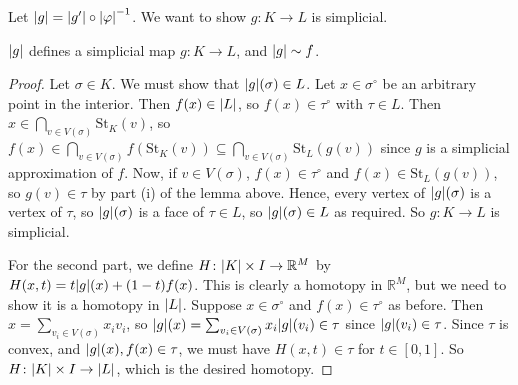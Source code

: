 Let \( \abs{g} = \abs{g'} \circ \abs{\varphi}^{-1} \).
We want to show \( g \colon K \to L \) is simplicial.
\begin{theorem}
	\( \abs{g} \) defines a simplicial map \( g \colon K \to L \), and \( \abs{g} \sim f \).
\end{theorem}
\begin{proof}
	Let \( \sigma \in K \).
	We must show that \( \abs{g}(\sigma) \in L \).
	Let \( x \in \sigma^\circ \) be an arbitrary point in the interior.
	Then \( f(x) \in \abs{L} \), so \( f(x) \in \tau^\circ \) with \( \tau \in L \).
	Then \( x \in \bigcap_{v \in V(\sigma)} \mathrm{St}_K(v) \), so \( f(x) \in \bigcap_{v \in V(\sigma)} f(\mathrm{St}_K(v)) \subseteq \bigcap_{v \in V(\sigma)} \mathrm{St}_L(g(v)) \) since \( g \) is a simplicial approximation of \( f \).
	Now, if \( v \in V(\sigma) \), \( f(x) \in \tau^\circ \) and \( f(x) \in \mathrm{St}_L(g(v)) \), so \( g(v) \in \tau \) by part (i) of the lemma above.
	Hence, every vertex of \( \abs{g}(\sigma) \) is a vertex of \( \tau \), so \( \abs{g}(\sigma) \) is a face of \( \tau \in L \), so \( \abs{g}(\sigma) \in L \) as required.
	So \( g \colon K \to L \) is simplicial.

	For the second part, we define \( H \colon \abs{K} \times I \to \mathbb R^M \) by \( H(x,t) = t \abs{g}(x) + (1-t)f(x) \).
	This is clearly a homotopy in \( \mathbb R^M \), but we need to show it is a homotopy in \( \abs{L} \).
	Suppose \( x \in \sigma^\circ \) and \( f(x) \in \tau^\circ \) as before.
	Then \( x = \sum_{v_i \in V(\sigma)} x_i v_i \), so \( \abs{g}(x) = \sum_{v_i \in V(\sigma)} x_i \abs{g}(v_i) \in \tau \) since \( \abs{g}(v_i) \in \tau \).
	Since \( \tau \) is convex, and \( \abs{g}(x), f(x) \in \tau \), we must have \( H(x,t) \in \tau \) for \( t \in [0,1] \).
	So \( H \colon \abs{K} \times I \to \abs{L} \), which is the desired homotopy.
\end{proof}
